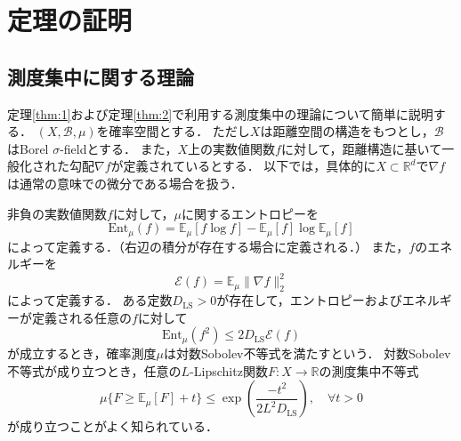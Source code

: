 \documentclass{jarticle}
\theoremstyle{definition}
\begin{document}


%
%

\appendix
\section{定理の証明}

\subsection{測度集中に関する理論}

定理\ref{thm:1}および定理\ref{thm:2}で利用する測度集中の理論について簡単に説明する．
$(X, \mathcal{B}, \mu)$を確率空間とする．
ただし$X$は距離空間の構造をもつとし，$\mathcal{B}$はBorel $\sigma$-fieldとする．
また，$X$上の実数値関数$f$に対して，距離構造に基いて一般化された勾配$\nabla f$が定義されているとする．
以下では，具体的に$X \subset \mathbb{R}^d$で$\nabla f$は通常の意味での微分である場合を扱う．

非負の実数値関数$f$に対して，$\mu$に関するエントロピーを
\begin{equation}
\mathrm{Ent}_{\mu} (f)=\mathbb{E}_{\mu} [f \log f] - \mathbb{E}_{\mu} [f] \log \mathbb{E}_{\mu} [f]
\end{equation}
によって定義する．（右辺の積分が存在する場合に定義される．）
また，$f$のエネルギーを
\begin{equation}
\mathcal{E}(f) = \mathbb{E}_\mu \parallel \nabla f \parallel_{2}^{2}
\end{equation}
によって定義する．
ある定数$D_\mathrm{LS} > 0$が存在して，エントロピーおよびエネルギーが定義される任意の$f$に対して
\begin{equation}
\mathrm{Ent}_\mu(f^2) \leq 2 D_\mathrm{LS} \mathcal{E}(f)
\label{eq:log_sobolev}
\end{equation}
が成立するとき，確率測度$\mu$は対数Sobolev不等式を満たすという．
対数Sobolev不等式が成り立つとき，任意の$L$-Lipschitz関数$F: X \to \mathbb{R}$の測度集中不等式
\begin{equation}
\mu \{ F \geq \mathbb{E}_\mu [F] + t \} \leq
\exp \left ( \frac{-t^2}{2L^2 D_\mathrm{LS}}\right), \quad \forall t > 0
\label{eq:lips_concentration}
\end{equation}
が成り立つことがよく知られている\cite{Boucheron2013,Ledoux1999}．
\end{document}
